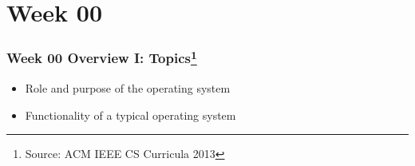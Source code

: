 
\section{Week 00}
\begin{frame}[fragile]
\frametitle{Week 00 Overview I:
Topics\footnote{Source: ACM IEEE CS Curricula 2013}}

\begin{itemize}
\item Role and purpose of the operating system 
\item Functionality of a typical operating system 
\end{itemize}
\end{frame}

